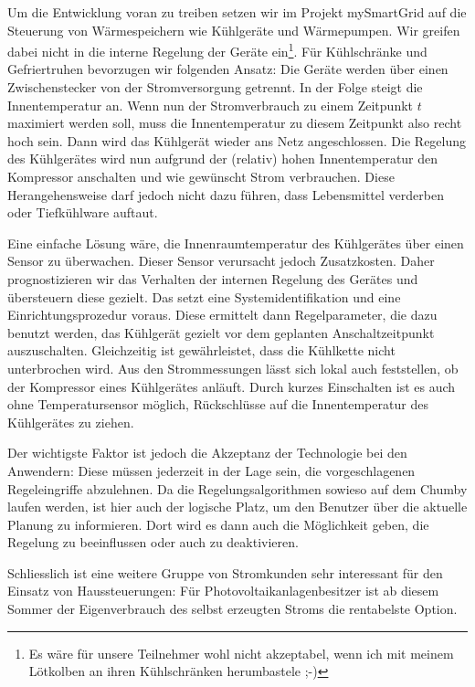 \documentclass[12pt,BCOR=8.5mm]{scrartcl}
\begin{document}
Um die Entwicklung voran zu treiben setzen wir im Projekt mySmartGrid
auf die Steuerung von Wärmespeichern wie Kühlgeräte und Wärmepumpen. Wir
greifen dabei nicht in die interne Regelung der Geräte
ein\footnote{Es wäre für unsere Teilnehmer wohl nicht akzeptabel, wenn
ich mit meinem Lötkolben an ihren Kühlschränken herumbastele ;-)}. Für
Kühlschränke und Gefriertruhen bevorzugen wir folgenden Ansatz: Die
Geräte werden über einen Zwischenstecker von der Stromversorgung
getrennt. In der Folge steigt die Innentemperatur an. Wenn nun der
Stromverbrauch zu einem Zeitpunkt $t$ maximiert werden soll, muss die
Innentemperatur zu diesem Zeitpunkt also recht hoch sein. Dann wird das
Kühlgerät wieder ans Netz angeschlossen. Die Regelung des Kühlgerätes
wird nun aufgrund der (relativ) hohen Innentemperatur den Kompressor
anschalten und wie gewünscht Strom verbrauchen. Diese Herangehensweise
darf jedoch nicht dazu führen, dass Lebensmittel verderben oder
Tiefkühlware auftaut.

Eine einfache Lösung wäre, die Innenraumtemperatur des Kühlgerätes über
einen Sensor zu überwachen. Dieser Sensor verursacht jedoch
Zusatzkosten. Daher prognostizieren wir das Verhalten der internen
Regelung des Gerätes und übersteuern diese gezielt. Das setzt eine
Systemidentifikation und eine Einrichtungsprozedur voraus. Diese
ermittelt dann Regelparameter, die dazu benutzt werden, das Kühlgerät
gezielt vor dem geplanten Anschaltzeitpunkt auszuschalten. Gleichzeitig
ist gewährleistet, dass die Kühlkette nicht unterbrochen wird. Aus den
Strommessungen lässt sich lokal auch feststellen, ob der Kompressor
eines Kühlgerätes anläuft. Durch kurzes Einschalten ist es auch ohne
Temperatursensor möglich, Rückschlüsse auf die Innentemperatur des
Kühlgerätes zu ziehen.


Der wichtigste Faktor ist jedoch die Akzeptanz der Technologie bei den
Anwendern: Diese müssen jederzeit in der Lage sein, die vorgeschlagenen
Regeleingriffe abzulehnen. Da die Regelungsalgorithmen sowieso auf dem
Chumby laufen werden, ist hier auch der logische Platz, um den Benutzer
über die aktuelle Planung zu informieren. Dort wird es dann auch die
Möglichkeit geben, die Regelung zu beeinflussen oder auch zu
deaktivieren.

Schliesslich ist eine weitere Gruppe von Stromkunden sehr interessant
für den Einsatz von Haussteuerungen: Für Photovoltaikanlagenbesitzer ist ab
diesem Sommer der Eigenverbrauch des selbst erzeugten Stroms die
rentabelste Option.
\end{document}
